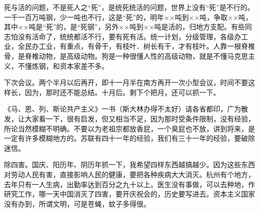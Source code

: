 死与活的问题，不是死人之“死”，是统死统活的问题，世界上没有“死”是不行的。一千一百万吨钢，少一吨也不行，这是“死”的，明年××吨到××吨，争取××吨，其中××吨是“死”的，是“死钢”，另外××吨到××吨是活的，归地方支配。有些同志怕没有活命了，统统都活不行，要有死有活。统一计划，分级管理，各级办工业，全民办工业，有重点，有骨干，有枝叶．树长有干，才有枝叶。人靠一根脊椎骨，是脊椎动物，是高级动物。狗是一种很懂人性的高级动物，就是不懂马克思主义，不懂炼钢，和资本家差不多。

下次会议。两个半月以后再开，即十一月半在南方再开一次小型会议，时间不要这样长，因为，那时还不能总结。十月后。剩下个把月，还可以抓一下。

《马、恩、列、斯论共产主义》一书（斯大林办得不太好）请各省都印，广为散发，让大家看一下，很有启发，但又相当不足，因为那时受条件限制，没有经验，所论当然模糊不明确。不要以为老祖宗都放香屁，一个臭屁也不放，讲到将来，是一定有许多模糊地方的。苏联有四十一年的经验，我们有三十一年的经验，要破除迷信。

除四害。国庆、阳历年、阴历年抓一下，我希望四样东西越搞越少。因为这些东西对劳动人民有害，直接影响人民的健康，要把各种疾病大大消灭。杭州有个地方，去年只有一人生病，出勤率达到百分之九十以上。医生没有事做，可以去种地，作研究工作，哪一天中国消灭了四害，要开庆祝会的，历史要写进去。资本主义国家没有办到，所谓文明，可是苍蝇，蚊子多得很。